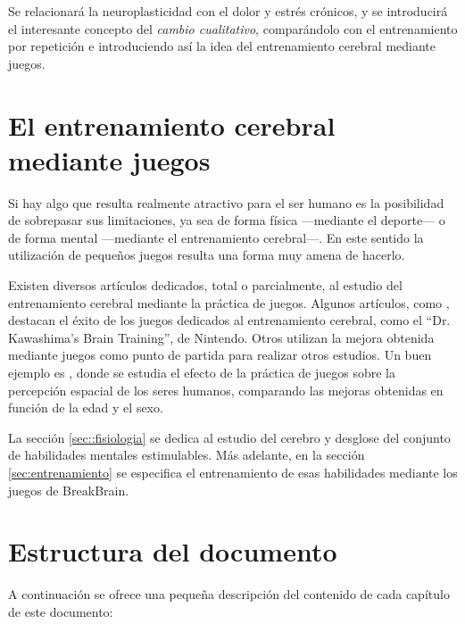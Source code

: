 Se relacionará la neuroplasticidad con el dolor y estrés crónicos, y se introducirá el interesante concepto del {\it cambio cualitativo}, comparándolo con el entrenamiento por repetición e introduciendo así la idea del entrenamiento cerebral mediante juegos.

\section{El entrenamiento cerebral mediante juegos}

Si hay algo que resulta realmente atractivo para el ser humano es la posibilidad de sobrepasar sus limitaciones, ya sea de forma física ---mediante el deporte--- o de forma mental ---mediante el entrenamiento cerebral---. En este sentido la utilización de pequeños juegos resulta una forma muy amena de hacerlo.

Existen diversos artículos dedicados, total o parcialmente, al estudio del entrenamiento cerebral mediante la práctica de juegos. Algunos artículos, como \cite{Hackley2011}, destacan el éxito de los juegos dedicados al entrenamiento cerebral, como el ``Dr. Kawashima's Brain Training'', de Nintendo. Otros utilizan la mejora obtenida mediante juegos como punto de partida para realizar otros estudios. Un buen ejemplo es \cite{Hirvasoja2004}, donde se estudia el efecto de la práctica de juegos sobre la percepción espacial de los seres humanos, comparando las mejoras obtenidas en función de la edad y el sexo.

La sección \ref{sec::fisiologia} se dedica al estudio del cerebro y desglose del conjunto de habilidades mentales estimulables. Más adelante, en la sección \ref{sec:entrenamiento} se especifica el entrenamiento de esas habilidades mediante los juegos de BreakBrain.

\section{Estructura del documento}

A continuación se ofrece una pequeña descripción del contenido de cada capítulo de este documento:

